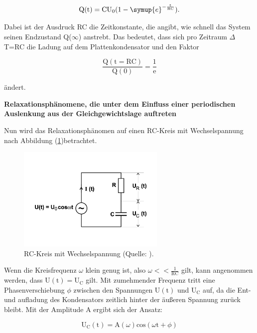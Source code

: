 \begin{enumerate}
\begin{equation}
\text{Q}(\text{t}) = \text{CU}_0 (1 - \symup{e}^{-\frac{\text{t}}{\text{RC}}}).
\end{equation}

Dabei ist der Ausdruck RC die Zeitkonstante, die angibt, wie schnell das System seinen Endzustand Q($\infty$) anstrebt.
Das bedeutet, dass sich pro Zeitraum $\Delta$T=RC die Ladung auf dem Plattenkondensator und den Faktor

\begin{equation}
\frac{\text{Q}(\text{t}=\text{RC})}{\text{Q}(0)} = \frac{1}{\text{e}}
\end{equation}

ändert.

\end{enumerate}

\newpage
\noindent
\textbf{Relaxationsphänomene, die unter dem Einfluss einer periodischen Auslenkung aus der Gleichgewichtslage auftreten}

\noindent
Nun wird das Relaxationsphänomen auf einen RC-Kreis mit Wechselspannung nach Abbildung (\ref{fig:rcwechsel})betrachtet.

\begin{figure}
            \centering
               \includegraphics[height=5cm]{rcwechsel.pdf}
               \caption{RC-Kreis mit Wechselspannung (Quelle: \cite{V353}).}
               \label{fig:rcwechsel}
\end{figure}

\noindent
Wenn die Kreisfrequenz $\omega$ klein genug ist, also $\omega << \frac{1}{\text{RC}}$ gilt, kann angenommen werden, dass $\text{U}(\text{t}) = \text{U}_\text{C}$ gilt.
Mit zumehmender Frequenz tritt eine Phasenverschiebung $\phi$ zwischen den Spannungen $\text{U}(\text{t})$ und $\text{U}_\text{C}$ auf, da die Ent- und aufladung des Kondensators zeitlich hinter der äußeren Spannung zurück bleibt.
Mit der Amplitude A ergibt sich der Ansatz:

\begin{equation}
\text{U}_\text{C} (\text{t}) = \text{A} (\omega) \text{cos}(\omega\text{t} + \phi)
\end{equation}

